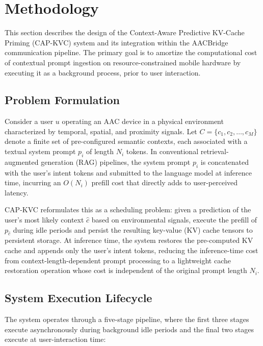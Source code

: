 \section{Methodology}
\label{sec:methodology}

This section describes the design of the Context-Aware Predictive KV-Cache Priming (CAP-KVC) system and its integration within the AACBridge communication pipeline. The primary goal is to amortize the computational cost of contextual prompt ingestion on resource-constrained mobile hardware by executing it as a background process, prior to user interaction.

\subsection{Problem Formulation}
\label{sec:problem}

Consider a user $u$ operating an AAC device in a physical environment characterized by temporal, spatial, and proximity signals. Let $C = \{c_1, c_2, \ldots, c_M\}$ denote a finite set of pre-configured semantic contexts, each associated with a textual system prompt $p_i$ of length $N_i$ tokens. In conventional retrieval-augmented generation (RAG) pipelines, the system prompt $p_i$ is concatenated with the user's intent tokens and submitted to the language model at inference time, incurring an $O(N_i)$ prefill cost that directly adds to user-perceived latency.

CAP-KVC reformulates this as a scheduling problem: given a prediction of the user's most likely context $\hat{c}$ based on environmental signals, execute the prefill of $p_{\hat{c}}$ during idle periods and persist the resulting key-value (KV) cache tensors to persistent storage. At inference time, the system restores the pre-computed KV cache and appends only the user's intent tokens, reducing the inference-time cost from context-length-dependent prompt processing to a lightweight cache restoration operation whose cost is independent of the original prompt length $N_i$.

\subsection{System Execution Lifecycle}
\label{sec:lifecycle}

The system operates through a five-stage pipeline, where the first three stages execute asynchronously during background idle periods and the final two stages execute at user-interaction time:

